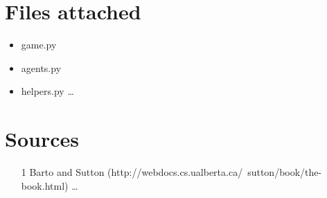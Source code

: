 \documentclass{article}
\begin{document}
\section*{Files attached}
\begin{itemize}
\item game.py
\item agents.py
\item helpers.py \ldots
\end{itemize}
\section*{Sources}


\begin{itemize}
	\item [1] Barto and Sutton (http://webdocs.cs.ualberta.ca/~sutton/book/the-book.html) \ldots
\end{itemize}
\end{document}
